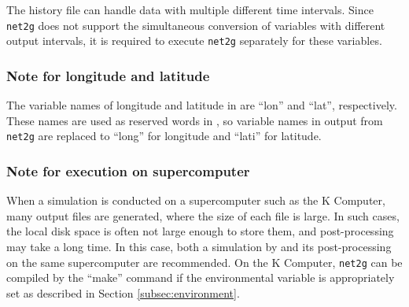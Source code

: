 The history file can handle data with multiple different time intervals.
Since \verb|net2g| does not support the simultaneous conversion of variables with different output intervals,
it is required to execute \verb|net2g| separately for these variables.


\subsubsection{Note for longitude and latitude}
The variable names of longitude and latitude in \scalerm are ``lon'' and ``lat'', respectively.
These names are used as reserved words in \grads,
so variable names in output from \verb|net2g| are replaced to ``long'' for longitude and ``lati'' for latitude.


\subsubsection{Note for execution on supercomputer}
When a simulation is conducted on a supercomputer such as the K Computer, many output files are generated, where the size of each file is large. In such cases, the local disk space is often not large enough to store them,  and post-processing may take a long time. In this case, both a simulation by \scalerm and its post-processing on the same supercomputer are recommended. On the K Computer, \verb|net2g| can be compiled by the ``make'' command  if the environmental variable is appropriately set as described in Section \ref{subsec:environment}.

